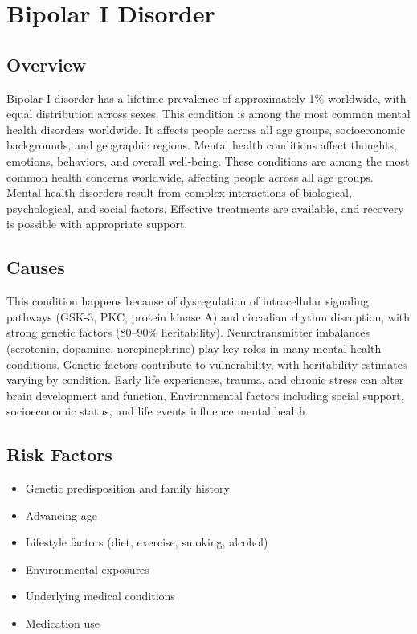 \chapter{Bipolar I Disorder}
\label{sec:Bipolar I Disorder}

\section{Overview}
Bipolar I disorder has a lifetime prevalence of approximately 1\% worldwide, with equal distribution across sexes. This condition is among the most common mental health disorders worldwide. It affects people across all age groups, socioeconomic backgrounds, and geographic regions. Mental health conditions affect thoughts, emotions, behaviors, and overall well-being. These conditions are among the most common health concerns worldwide, affecting people across all age groups. Mental health disorders result from complex interactions of biological, psychological, and social factors. Effective treatments are available, and recovery is possible with appropriate support.
\section{Causes}
This condition happens because of dysregulation of intracellular signaling pathways (GSK-3, PKC, protein kinase A) and circadian rhythm disruption, with strong genetic factors (80--90\% heritability).  Neurotransmitter imbalances (serotonin, dopamine, norepinephrine) play key roles in many mental health conditions. Genetic factors contribute to vulnerability, with heritability estimates varying by condition. Early life experiences, trauma, and chronic stress can alter brain development and function. Environmental factors including social support, socioeconomic status, and life events influence mental health.   
\section{Risk Factors}
\begin{itemize}[noitemsep]
  \item Genetic predisposition and family history
  \item Advancing age
  \item Lifestyle factors (diet, exercise, smoking, alcohol)
  \item Environmental exposures
  \item Underlying medical conditions
  \item Medication use
\end{itemize}
